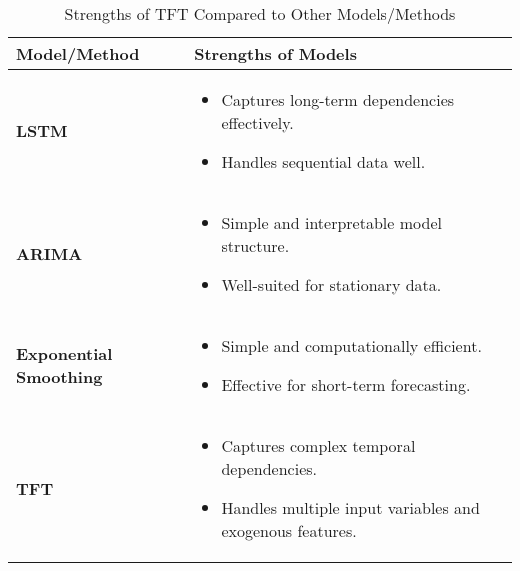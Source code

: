 \renewcommand{\tablename}{Table}
	\begin{table}[!ht]
		\small %
		\centering
		\setlength{\tabcolsep}{5pt} %
		\begin{tabular}{|l|p{9cm}|} %
			\hline
			\textbf{Model/Method} & \textbf{Strengths of Models} \\ \hline
			\textbf{LSTM} & 
			\begin{itemize}
				\item Captures long-term dependencies effectively.
				\item Handles sequential data well.
			\end{itemize} \\ \hline
			\textbf{ARIMA} &
			\begin{itemize}
				\item Simple and interpretable model structure.
				\item Well-suited for stationary data.
			\end{itemize} \\ \hline
			\textbf{Exponential Smoothing} &
			\begin{itemize}
				\item Simple and computationally efficient.
				\item Effective for short-term forecasting.
			\end{itemize} \\ \hline
			\textbf{TFT} &
			\begin{itemize}
				\item Captures complex temporal dependencies.
				\item Handles multiple input variables and exogenous features.
			\end{itemize} \\ \hline
		\end{tabular}
		\caption{Strengths of TFT Compared to Other Models/Methods}
		\label{tab:comparison}
	\end{table}
	


